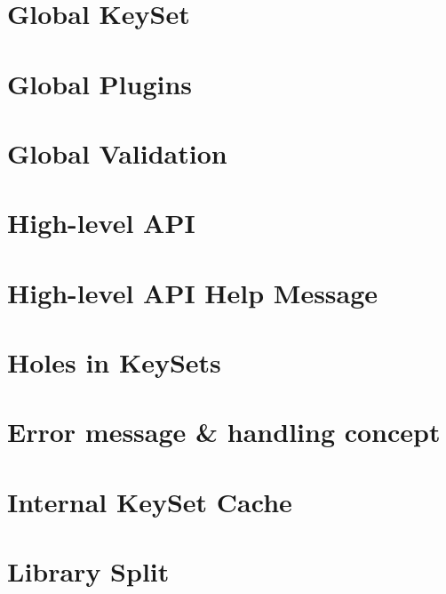 \let\mypdfximage\pdfximage\def\pdfximage{\immediate\mypdfximage}\documentclass[twoside]{book}
\newcommand{\+}{\discretionary{\mbox{\scriptsize$\hookleftarrow$}}{}{}}
\begin{document}
\chapter{Global Key\+Set}
\label{doc_decisions_global_keyset_md}

\chapter{Global Plugins}
\label{doc_decisions_global_plugins_md}

\chapter{Global Validation}
\label{doc_decisions_global_validation_md}

\chapter{High-\/level A\+PI}
\label{doc_decisions_high_level_api_md}

\chapter{High-\/level A\+PI Help Message}
\label{doc_decisions_highlevel_help_message_md}

\chapter{Holes in Key\+Sets}
\label{doc_decisions_holes_md}

\chapter{Error message \& handling concept}
\label{doc_decisions_ingroup_removal_md}

\chapter{Internal Key\+Set Cache}
\label{doc_decisions_internal_cache_md}

\chapter{Library Split}
\label{doc_decisions_library_split_md}

\end{document}
